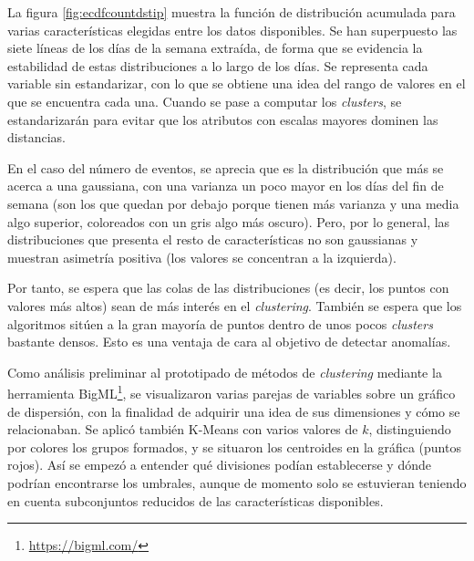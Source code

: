 La figura \ref{fig:ecdfcountdstip} muestra la función de distribución acumulada para varias características elegidas entre los datos disponibles.
Se han superpuesto las siete líneas de los días de la semana extraída, de forma que se evidencia la estabilidad de estas distribuciones a lo largo de los días.
Se representa cada variable sin estandarizar, con lo que se obtiene una idea del rango de valores en el que se encuentra cada una.
Cuando se pase a computar los \emph{clusters}, se estandarizarán para evitar que los atributos con escalas mayores dominen las distancias.

En el caso del número de eventos, se aprecia que es la distribución que más se acerca a una gaussiana, con una varianza un poco mayor en los días del fin de semana
(son los que quedan por debajo porque tienen más varianza y una media algo superior, coloreados con un gris algo más oscuro).
Pero, por lo general, las distribuciones que presenta el resto de características no son gaussianas y muestran asimetría positiva (los valores se concentran a la izquierda).

Por tanto, se espera que las colas de las distribuciones (es decir, los puntos con valores más altos) sean de más interés en el \emph{clustering}.
También se espera que los algoritmos sitúen a la gran mayoría de puntos dentro de unos pocos \emph{clusters} bastante densos.
Esto es una ventaja de cara al objetivo de detectar anomalías.

Como análisis preliminar al prototipado de métodos de \emph{clustering} mediante la herramienta BigML\footnote{\url{https://bigml.com/}},
se visualizaron varias parejas de variables sobre un gráfico de dispersión, con la finalidad de adquirir una idea de sus dimensiones y cómo se relacionaban.
Se aplicó también K-Means con varios valores de $k$, distinguiendo por colores los grupos formados, y se situaron los centroides en la gráfica (puntos rojos).
Así se empezó a entender qué divisiones podían establecerse y dónde podrían encontrarse los umbrales,
aunque de momento solo se estuvieran teniendo en cuenta subconjuntos reducidos de las características disponibles.

